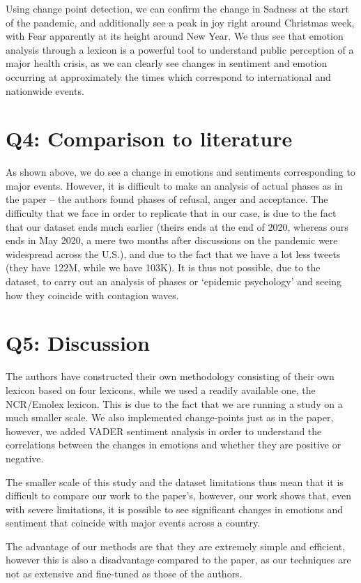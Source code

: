 Using change point detection, we can confirm the change in Sadness at the start of the pandemic, and additionally see a peak in joy right around Christmas week, with Fear apparently at its height around New Year.
We thus see that emotion analysis through a lexicon is a powerful tool to understand public perception of a major health crisis, as we can clearly see changes in sentiment and emotion occurring at approximately the times which correspond to international and nationwide events.


\section*{Q4: Comparison to literature}
As shown above, we do see a change in emotions and sentiments corresponding to major events. However, it is difficult to make an analysis of actual phases as in the paper -- the authors found phases of refusal, anger and acceptance. The difficulty that we face in order to replicate that in our case, is due to the fact that our dataset ends much earlier (theirs ends at the end of 2020, whereas ours ends in May 2020, a mere two months after discussions on the pandemic were widespread across the U.S.), and due to the fact that we have a lot less tweets (they have 122M, while we have 103K). It is thus not possible, due to the dataset, to carry out an analysis of phases or ‘epidemic psychology’ and seeing how they coincide with contagion waves.


\section*{Q5: Discussion}
The authors have constructed their own methodology consisting of their own lexicon based on four lexicons, while we used a readily available one, the NCR/Emolex lexicon. This is due to the fact that we are running a study on a much smaller scale. We also implemented change-points just as in the paper, however, we added VADER sentiment analysis in order to understand the correlations between the changes in emotions and whether they are positive or negative.

The smaller scale of this study and the dataset limitations thus mean that it is difficult to compare our work to the paper’s, however, our work shows that, even with severe limitations, it is possible to see significant changes in emotions and sentiment that coincide with major events across a country.

The advantage of our methods are that they are extremely simple and efficient, however this is also a disadvantage compared to the paper, as our techniques are not as extensive and fine-tuned as those of the authors.

